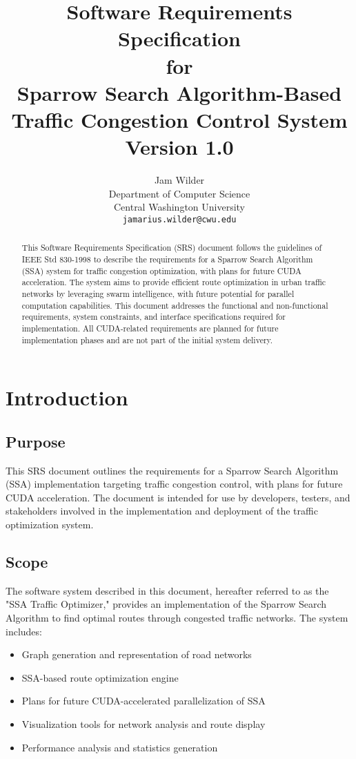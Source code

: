 \documentclass[conference]{IEEEtran}
\title{Software Requirements Specification\\
       for\\
       Sparrow Search Algorithm-Based Traffic Congestion Control System\\
       Version 1.0}
\author{Jam Wilder \\
Department of Computer Science \\
Central Washington University \\
\texttt{jamarius.wilder@cwu.edu}}
\begin{document}
\maketitle

\begin{abstract}
This Software Requirements Specification (SRS) document follows the guidelines of IEEE Std 830-1998 to describe the requirements for a Sparrow Search Algorithm (SSA) system for traffic congestion optimization, with plans for future CUDA acceleration. The system aims to provide efficient route optimization in urban traffic networks by leveraging swarm intelligence, with future potential for parallel computation capabilities. This document addresses the functional and non-functional requirements, system constraints, and interface specifications required for implementation. All CUDA-related requirements are planned for future implementation phases and are not part of the initial system delivery.
\end{abstract}

\tableofcontents

\newpage

\section{Introduction}

\subsection{Purpose}
This SRS document outlines the requirements for a Sparrow Search Algorithm (SSA) implementation targeting traffic congestion control, with plans for future CUDA acceleration. The document is intended for use by developers, testers, and stakeholders involved in the implementation and deployment of the traffic optimization system.

\subsection{Scope}
The software system described in this document, hereafter referred to as the "SSA Traffic Optimizer," provides an implementation of the Sparrow Search Algorithm to find optimal routes through congested traffic networks. The system includes:

\begin{itemize}
    \item Graph generation and representation of road networks
    \item SSA-based route optimization engine
    \item Plans for future CUDA-accelerated parallelization of SSA
    \item Visualization tools for network analysis and route display
    \item Performance analysis and statistics generation
\end{itemize}
\end{document}
